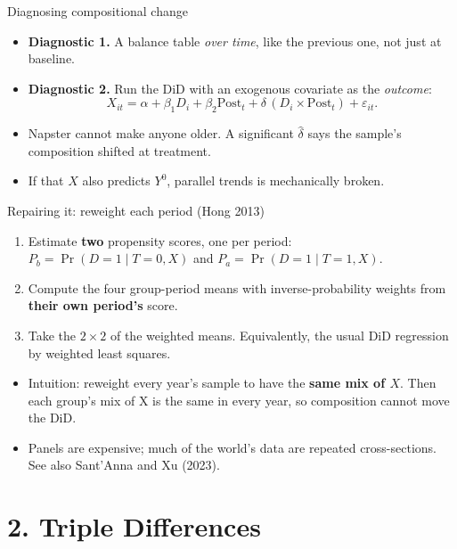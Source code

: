 \documentclass[
  11pt,
  ignorenonframetext,
  aspectratio=169,
]{beamer}
\providecommand{\tightlist}{%
  \setlength{\itemsep}{0pt}\setlength{\parskip}{0pt}}
\begin{document}
\begin{frame}{Diagnosing compositional change}
\protect{}\label{diagnosing-compositional-change}
\begin{itemize}
\tightlist
\item
  \textbf{Diagnostic 1.} A balance table \emph{over time}, like the
  previous one, not just at baseline.
\item
  \textbf{Diagnostic 2.} Run the DiD with an exogenous covariate as the
  \emph{outcome}: \[
  X_{it} = \alpha + \beta_1 D_i + \beta_2 \text{Post}_t + \delta\,(D_i \times \text{Post}_t) + \varepsilon_{it}.
  \]
\item
  Napster cannot make anyone older. A significant \(\hat\delta\) says
  the sample's composition shifted at treatment.
\item
  If that \(X\) also predicts \(Y^0\), parallel trends is mechanically
  broken.
\end{itemize}
\end{frame}

\begin{frame}{Repairing it: reweight each period (Hong 2013)}
\protect{}\label{repairing-it-reweight-each-period-hong-2013}
\begin{enumerate}
\tightlist
\item
  Estimate \textbf{two} propensity scores, one per period:
  \(P_b = \Pr(D=1 \mid T=0, X)\) and \(P_a = \Pr(D=1 \mid T=1, X)\).
\item
  Compute the four group-period means with inverse-probability weights
  from \textbf{their own period's} score.
\item
  Take the \(2 \times 2\) of the weighted means. Equivalently, the usual
  DiD regression by weighted least squares.
\end{enumerate}

\vspace{0.4em}

\begin{itemize}
\tightlist
\item
  Intuition: reweight every year's sample to have the \textbf{same mix
  of \(X\)}. Then each group's mix of X is the same in every year, so
  composition cannot move the DiD.
\item
  Panels are expensive; much of the world's data are repeated
  cross-sections. See also Sant'Anna and Xu (2023).
\end{itemize}
\end{frame}

\section{2. Triple Differences}\label{triple-differences}
\end{document}
